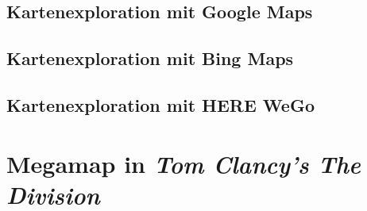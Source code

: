 \subsection{Kartenexploration mit Google Maps}
\subsection{Kartenexploration mit Bing Maps}
\subsection{Kartenexploration mit HERE WeGo}

\section{Megamap in \emph{Tom Clancy's The Division}}

